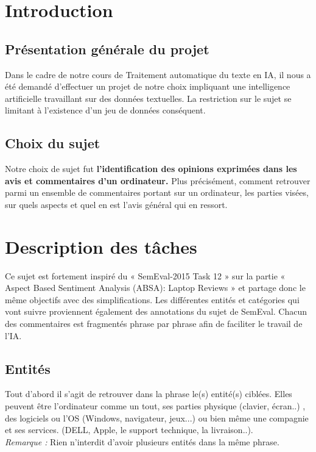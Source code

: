 \documentclass[12pt ,a4paper ]{article}
\begin{document}
\begin{multicols}{2} 
\section{Introduction}

	\subsection{Présentation générale du projet}
		Dans le cadre de notre cours de Traitement automatique du texte en IA, il nous a été demandé d'effectuer un projet de notre choix impliquant une intelligence artificielle travaillant sur des données textuelles. La restriction sur le sujet se limitant à l'existence d'un jeu de données conséquent.
	
	\subsection{Choix du sujet}
		Notre choix de sujet fut \textbf{l'identification des opinions exprimées dans les avis et commentaires d’un ordinateur.} Plus précisément, comment retrouver parmi un ensemble de commentaires portant sur un ordinateur, les parties visées,  sur quels aspects et quel en est l'avis général qui en ressort. 
		
\section{Description des tâches}
Ce sujet est fortement inspiré du « SemEval-2015 Task 12 » sur la partie « Aspect Based Sentiment Analysis (ABSA): Laptop Reviews » et partage donc le même objectifs avec des simplifications. Les différentes entités et catégories qui vont suivre proviennent également des annotations du sujet de SemEval. Chacun des commentaires est fragmentés phrase par phrase afin de faciliter le travail de l'IA. 
		
\subsection{Entités}
\noindent Tout d'abord il s'agit de retrouver dans la phrase le(s) entité(s) ciblées. Elles peuvent être l'ordinateur comme un tout, ses parties physique (clavier, écran..) , des logiciels ou l'OS (Windows, navigateur, jeux...) ou bien même une compagnie et ses services. (DELL, Apple, le support technique, la livraison..).\\

\noindent\textit{Remarque : } Rien n'interdit d'avoir plusieurs entités dans la même phrase.\\
		

\end{multicols}
\end{document}
